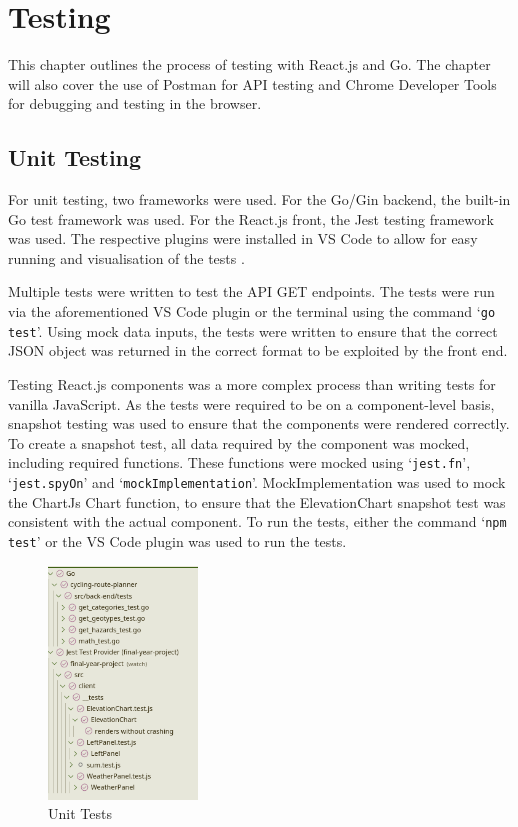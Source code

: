 \chapter{Testing}
\label{chap:testing}

This chapter outlines the process of testing with React.js and Go. The chapter will also cover the use of Postman for API testing and Chrome Developer Tools for debugging and testing in the browser.

\section{Unit Testing}
\label{testing:unit}


For unit testing, two frameworks were used. For the Go/Gin backend, the built-in Go test framework was used. For the React.js front, the Jest testing framework was used. The respective plugins were installed in VS Code to allow for easy running and visualisation of the tests .

Multiple tests were written to test the API GET endpoints. The tests were run via the aforementioned VS Code plugin or the terminal using the command `\texttt{go test}'. Using mock data inputs, the tests were written to ensure that the correct JSON object was returned in the correct format to be exploited by the front end.

Testing React.js components was a more complex process than writing tests for vanilla JavaScript. As the tests were required to be on a component-level basis, snapshot testing was used to ensure that the components were rendered correctly. To create a snapshot test, all data required by the component was mocked, including required functions. These functions were mocked using `\texttt{jest.fn}', `\texttt{jest.spyOn}' and `\texttt{mockImplementation}'. MockImplementation was used to mock the ChartJs Chart function, to ensure that the ElevationChart snapshot test was consistent with the actual component. To run the tests, either the command `\texttt{npm test}' or the VS Code plugin was used to run the tests.

\begin{figure}[!ht]
    \centering
    \includegraphics[width=150px]{figures/unit-tests.png}
    \caption{Unit Tests}
    \label{fig:unit-tests}
  \end{figure}

